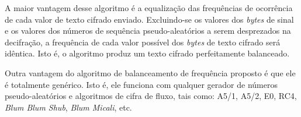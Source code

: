 A maior vantagem desse algoritmo é a equalização das frequências de ocorrência de cada valor de texto cifrado enviado. Excluindo-se os valores dos \textit{bytes} de sinal e os valores dos números de sequência pseudo-aleatórios a serem desprezados na decifração, a frequência de cada valor possível dos \textit{bytes} de texto cifrado será idêntica. Isto é, o algoritmo produz um texto cifrado perfeitamente balanceado.

Outra vantagem do algoritmo de balanceamento de frequência proposto é que ele é totalmente genérico.  Isto é, ele funciona com qualquer gerador de números pseudo-aleatórios e algoritmos de cifra de fluxo, tais como: A5/1, A5/2, E0, RC4, \textit{Blum Blum Shub}, \textit{Blum Micali}, etc.
